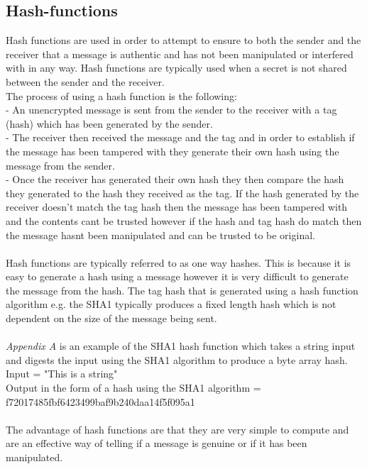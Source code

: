 \documentclass[a4paper, twoside, 11pt]{article}
\begin{document}
\subsection{Hash-functions}
Hash functions are used in order to attempt to ensure to both the sender and the receiver that a message is authentic and has not been manipulated or interfered with in any way. Hash functions are typically used when a secret is not shared between the sender and the receiver. 
\\
The process of using a hash function is the following:\\
- An unencrypted message is sent from the sender to the receiver with a tag (hash) which has been generated by the sender.\\
- The receiver then received the message and the tag and in order to establish if the message has been tampered with they generate their own hash using the message from the sender.\\
- Once the receiver has generated their own hash they then compare the hash they generated to the hash they received as the tag. If the hash generated by the receiver doesn't match the tag hash then the message has been tampered with and the contents cant be trusted however if the hash and tag hash do match then the message hasnt been manipulated and can be trusted to be original.\\
\\
Hash functions are typically referred to as one way hashes. This is because it is easy to generate a hash using a message however it is very difficult to generate the message from the hash. The tag hash that is generated using a hash function algorithm e.g. the SHA1 typically produces a fixed length hash which is not dependent on the size of the message being sent.\\
\\
\textit{Appendix A} is an example of the SHA1 hash function which takes a string input and digests the input using the SHA1 algorithm to produce a byte array hash. 
\\
Input = "This is a string"\\
Output in the form of a hash using the SHA1 algorithm = f72017485fbf6423499baf9b240daa14f5f095a1\\
\\
The advantage of hash functions are that they are very simple to compute and are an effective way of telling if a message is genuine or if it has been manipulated.\\
\\
\end{document}
